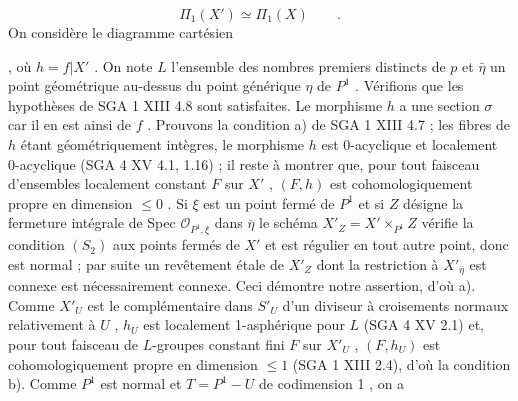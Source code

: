 \begin{equation*}
\Pi_1(X') \simeq \Pi_1(X) \qquad .
\end{equation*}
On considère le diagramme cartésien

\qquad ,
où $h = f|X'$ . On note $L$ l'ensemble des nombres premiers distincts de $p$ et $\bar{\eta}$ un point géométrique au-dessus du point générique $\eta$ de $P^1$ . Vérifions que les hypothèses de SGA 1 XIII 4.8 sont satisfaites. Le morphisme $h$ a une section $\sigma$ car il en est ainsi de $f$ . Prouvons la condition a) de SGA 1 XIII 4.7 ; les fibres de $h$ étant géométriquement intègres, le morphisme $h$ est 0-acyclique et localement 0-acyclique (SGA 4 XV 4.1, 1.16) ; il reste à montrer que, pour tout faisceau d'ensembles localement constant $F$ sur $X'$ , $(F,h)$ est cohomologiquement propre en dimension $\leqslant 0$ . Si $\xi$ est un point fermé de $P^1$ et si $Z$ désigne la fermeture intégrale de Spec $\mathcal{O}_{P^1,\xi}$ dans $\bar{\eta}$ le schéma $X'_Z = X'\times_{P^1} Z$ vérifie la condition $(S_2)$ aux points fermés de $X'$ et est régulier en tout autre point, donc est normal ; par suite un revêtement étale de $X'_Z$ dont la restriction à $X'_{\bar{\eta}}$ est connexe est nécessairement connexe. Ceci démontre notre assertion, d'où a). Comme $X'_U$ est le complémentaire dans $S'_U$ d'un diviseur à croisements normaux relativement à $U$ , $h_U$ est localement 1-asphérique pour $L$ (SGA 4 XV 2.1) et, pour tout faisceau de $L$-groupes constant fini $F$ sur $X'_U$ , $(F,h_U)$ est cohomologiquement propre en dimension $\leqslant 1$ (SGA 1 XIII 2.4), d'où la condition b). Comme $P^1$ est normal et $T = P^1 - U$ de
codimension 1 , on a

